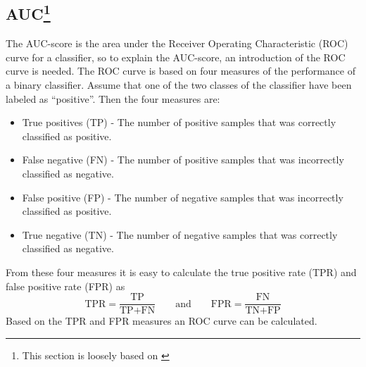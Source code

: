 \subsection[AUC]{AUC\protect\footnote{This section is loosely based on \citet[p.296-301]{kumar06}}}\label{sec:auc}
The AUC-score is the area under the Receiver Operating Characteristic (ROC) curve for a classifier, so to explain the AUC-score, an introduction of the ROC curve is needed. The ROC curve is based on four measures of the performance of a binary classifier. Assume that one of the two classes of the classifier have been labeled as ``positive''. Then the four measures are:
\begin{itemize}
    \item True positives (TP) - The number of positive samples that was correctly classified as positive.
    \item False negative (FN) - The number of positive samples that was incorrectly classified as negative.
    \item False positive (FP) - The number of negative samples that was incorrectly classified as positive.
    \item True negative (TN) - The number of negative samples that was correctly classified as negative.
\end{itemize}
From these four measures it is easy to calculate the true positive rate (TPR) and false positive rate (FPR) as
\[
\text{TPR} = \frac{\text{TP}}{\text{TP}+\text{FN}}\quad\quad\text{and}\quad\quad \text{FPR} = \frac{\text{FN}}{\text{TN}+\text{FP}}
\]
Based on the TPR and FPR measures an ROC curve can be calculated.

